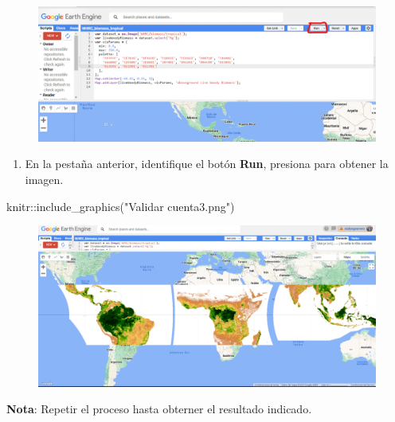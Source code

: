 \documentclass[
  letterpaper,
  DIV=11,
  numbers=noendperiod]{scrartcl}
\newenvironment{Shaded}{\begin{snugshade}}{\end{snugshade}}
\newcommand{\FunctionTok}[1]{\textcolor[rgb]{0.28,0.35,0.67}{#1}}
\newcommand{\NormalTok}[1]{\textcolor[rgb]{0.00,0.23,0.31}{#1}}
\newcommand{\SpecialCharTok}[1]{\textcolor[rgb]{0.37,0.37,0.37}{#1}}
\newcommand{\StringTok}[1]{\textcolor[rgb]{0.13,0.47,0.30}{#1}}
\providecommand{\tightlist}{%
  \setlength{\itemsep}{0pt}\setlength{\parskip}{0pt}}\usepackage{longtable,booktabs,array}
\begin{document}
\begin{figure}[H]

{\centering \includegraphics[width=5.25in,height=\textheight]{Validar cuenta2.png}

}

\end{figure}

\begin{enumerate}
\def\labelenumi{\arabic{enumi}.}
\setcounter{enumi}{3}
\tightlist
\item
  En la pestaña anterior, identifique el botón \textbf{Run}, presiona
  para obtener la imagen.
\end{enumerate}

\begin{Shaded}
\begin{Highlighting}[]
\NormalTok{knitr}\SpecialCharTok{::}\FunctionTok{include\_graphics}\NormalTok{(}\StringTok{"Validar cuenta3.png"}\NormalTok{)}
\end{Highlighting}
\end{Shaded}

\begin{figure}[H]

{\centering \includegraphics[width=6.39in,height=\textheight]{Validar cuenta3.png}

}

\end{figure}

\textbf{Nota}: Repetir el proceso hasta obterner el resultado indicado.
\end{document}
